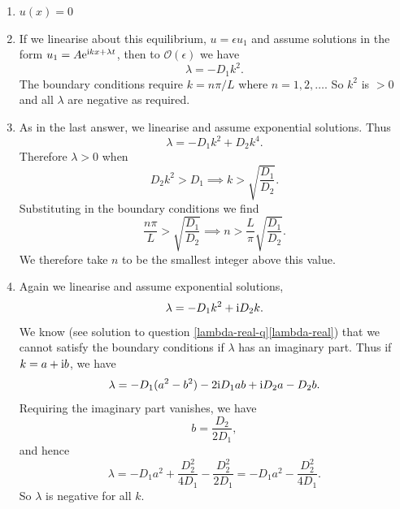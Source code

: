\documentclass[a4paper, 12pt]{article}
\begin{document}
\begin{enumerate}[label={\bf \arabic{*}.\;}, ref={\arabic{*}},itemsep=3ex, left=0ex]
{\begin{enumerate}[label=(\alph*)]
      \end{enumerate}
    }
    {
      \begin{enumerate}[label=(\alph*)]
        \item{
            $u(x)=0$
          }
        \item{
            If we linearise about this equilibrium, $u = \epsilon u_1$ and assume solutions in the form $u_1= A\mathrm{e} ^{\mathrm{i} k x+\lambda t}$, then to $\mathcal{O}(\epsilon)$ we have
            \begin{equation}
              \lambda = -D_1k^2.
            \end{equation}
            The boundary conditions require $k=n\pi/L$ where $n =1,2,\dots$. So $k^2$ is $>0$ and all $\lambda$ are negative as required.
          }
        \item{
            As in the last answer, we linearise and assume exponential solutions. Thus
            \begin{equation}
              \lambda = -D_1k^2+ D_2k^4.
            \end{equation}
            Therefore $\lambda >0$ when
            \begin{equation}
              D_2k^2> D_1\implies k>\sqrt{\frac{D_1}{D_2}}.
            \end{equation}
            Substituting in the boundary conditions we find
            \begin{equation}
              \frac{n\pi}{L} >\sqrt{\frac{D_1}{D_2}}\implies n>\frac{L}{\pi}\sqrt{\frac{D_1}{D_2}}.
            \end{equation}
            We therefore take $n$ to be the smallest integer above this value.
          }
        \item{
            Again we linearise and assume exponential solutions,
            \begin{equation}
              \lambda = -D_1k^2  +\mathrm{i} D_2 k.
            \end{equation}
            We know (see solution to question \ref{lambda-real-q}\ref{lambda-real}) that we cannot satisfy the boundary conditions if $\lambda$ has an imaginary part. Thus if $k=a + \mathrm{i} b$,  we have
            \begin{equation}
              \lambda = -D_1(a^2 - b^2) - 2\mathrm{i} D_1a b +\mathrm{i} D_2a - D_2 b.
            \end{equation}
            Requiring the imaginary part vanishes, we have
            \begin{equation}
              b = \frac{D_2}{2D_1},
            \end{equation}
            and hence
            \begin{equation}
              \lambda = -D_1a^2 + \frac{D_2^2}{4 D_1} - \frac{D_2^2}{2 D_1} =  -D_1a^2- \frac{D_2^2}{4 D_1}.
            \end{equation}
            So $\lambda$ is negative for all $k$.
          }
      \end{enumerate}

}
\end{enumerate}
\end{document}
